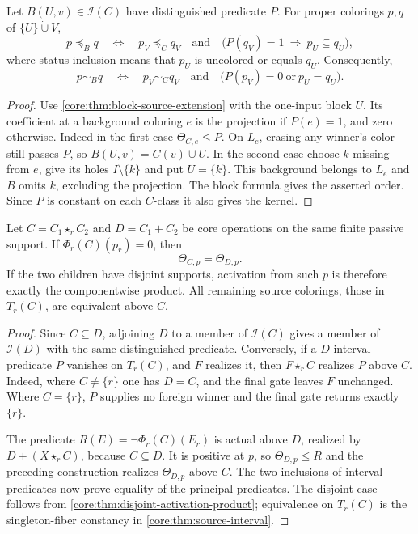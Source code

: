 \begin{theorem}
\label{core:thm:source-extension-activation}
Let $B(U,v)\in\mathcal I(C)$ have distinguished predicate $P$.
For proper colorings $p,q$ of $\{U\}\mathbin{\dot\cup}V$,
\[
 p\preceq_Bq\quad\Longleftrightarrow\quad
 p_V\preceq_Cq_V\quad\text{and}\quad
 \bigl(P(q_V)=1\ \Longrightarrow\ p_U\subseteq q_U\bigr),
\]
where status inclusion means that $p_U$ is uncolored or equals $q_U$.
Consequently,
\[
 p\sim_Bq\quad\Longleftrightarrow\quad
 p_V\sim_Cq_V\quad\text{and}\quad
 \bigl(P(p_V)=0\ \text{or}\ p_U=q_U\bigr).
\]
\end{theorem}
\begin{proof}
Use \cref{core:thm:block-source-extension} with the one-input block
$U$. Its coefficient at a background coloring $e$ is the projection
if $P(e)=1$, and zero otherwise. Indeed in the first case
$\Theta_{C,e}\leq P$. On $L_e$, erasing any winner's color still
passes $P$, so $B(U,v)=C(v)\cup U$. In the second case choose $k$
missing from $e$, give its holes $I\setminus\{k\}$ and put
$U=\{k\}$. This background belongs to $L_e$ and $B$ omits $k$,
excluding the projection. The block formula gives the asserted order.
Since $P$ is constant on each $C$-class it also gives the kernel.
\end{proof}

\begin{corollary}
\label{core:cor:owned-choice-activation}
Let $C=C_1\star_r C_2$ and $D=C_1+C_2$ be core operations on the
same finite passive support. If $\Phi_r(C)(p_r)=0$, then
\[
 \Theta_{C,p}=\Theta_{D,p}.
\]
If the two children have disjoint supports, activation from such $p$
is therefore exactly the componentwise product. All remaining source
colorings, those in $T_r(C)$, are equivalent above $C$.
\end{corollary}
\begin{proof}
Since $C\subseteq D$, adjoining $D$ to a member of $\mathcal I(C)$
gives a member of $\mathcal I(D)$ with the same distinguished predicate.
Conversely, if a $D$-interval predicate $P$ vanishes on $T_r(C)$,
and $F$ realizes it, then $F\star_r C$ realizes $P$ above $C$.
Indeed, where $C\ne\{r\}$ one has $D=C$, and the final gate leaves
$F$ unchanged. Where $C=\{r\}$, $P$ supplies no foreign winner and
the final gate returns exactly $\{r\}$.

The predicate $R(E)=\neg\Phi_r(C)(E_r)$ is actual above $D$, realized
by $D+(X\star_r C)$, because $C\subseteq D$.
It is positive at $p$, so $\Theta_{D,p}\leq R$ and the preceding
construction realizes $\Theta_{D,p}$ above $C$. The two inclusions of
interval predicates now prove equality of the principal predicates.
The disjoint case follows from \cref{core:thm:disjoint-activation-product};
equivalence on $T_r(C)$ is the singleton-fiber constancy in
\cref{core:thm:source-interval}.
\end{proof}

